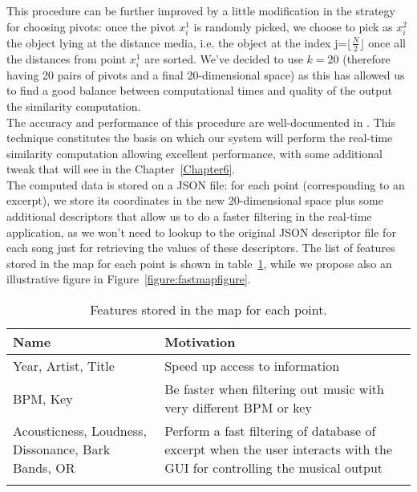 This procedure can be further improved by a little modification in the strategy for choosing pivots: once the pivot $x_i^1$ is randomly picked, we choose to pick as $x_i^2$ the object lying at the distance media, i.e. the object at the index j=$ \lfloor \frac{N}{2} \rfloor$ once all the distances from point $x_i^1$ are sorted. We've decided to use $k=20$ (therefore having 20 pairs of pivots and a final 20-dimensional space) as this has allowed us to find a good balance between computational times and quality of the output the similarity computation.\\
The accuracy and performance of this procedure are well-documented in \cite{fastmap12}. This technique constitutes the basis on which our system will perform the real-time similarity computation allowing excellent performance, with some additional tweak that will see in the Chapter~\ref{Chapter6}. \\
The computed data is stored on a JSON file: for each point (corresponding to an excerpt), we store its coordinates in the new 20-dimensional space plus some additional descriptors that allow us to do a faster filtering in the real-time application, as we won't need to lookup to the original JSON descriptor file for each song just for retrieving the values of these descriptors. The list of features stored in the map for each point is shown in table~\ref{table:fastmap}, while we propose also an illustrative figure in Figure~\ref{figure:fastmapfigure}.


\newpage
\begin{center}
\begin{longtable}{| p{} | p{} |} 
\hline
\textbf{Name} &  \textbf{Motivation} \\ \hline
Year, Artist, Title & Speed up access to information\\ \hline
BPM, Key & Be faster when filtering out music with very different BPM or key\\ \hline
Acousticness, Loudness, Dissonance, Bark Bands, OR & Perform a fast filtering of database of excerpt when the user interacts with the GUI for controlling the musical output\\ \hline
\caption[Features stored in the map]{Features stored in the map for each point.}
\label{table:fastmap}
\end{longtable}
\end{center}